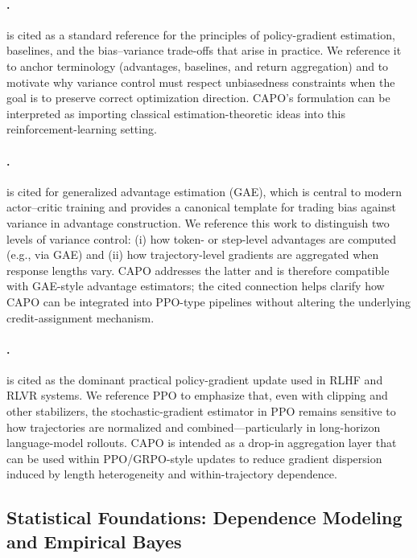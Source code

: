 \paragraph{\citet{sutton2018rl}.}
\citet{sutton2018rl} is cited as a standard reference for the principles of policy-gradient estimation, baselines, and the bias--variance trade-offs that arise in practice.
We reference it to anchor terminology (advantages, baselines, and return aggregation) and to motivate why variance control must respect unbiasedness constraints when the goal is to preserve correct optimization direction.
CAPO's formulation can be interpreted as importing classical estimation-theoretic ideas into this reinforcement-learning setting.

\paragraph{\citet{schulman2016gae}.}
\citet{schulman2016gae} is cited for generalized advantage estimation (GAE), which is central to modern actor--critic training and provides a canonical template for trading bias against variance in advantage construction.
We reference this work to distinguish two levels of variance control: (i) how token- or step-level advantages are computed (e.g., via GAE) and (ii) how trajectory-level gradients are aggregated when response lengths vary.
CAPO addresses the latter and is therefore compatible with GAE-style advantage estimators; the cited connection helps clarify how CAPO can be integrated into PPO-type pipelines without altering the underlying credit-assignment mechanism.

\paragraph{\citet{schulman2017ppo}.}
\citet{schulman2017ppo} is cited as the dominant practical policy-gradient update used in RLHF and RLVR systems.
We reference PPO to emphasize that, even with clipping and other stabilizers, the stochastic-gradient estimator in PPO remains sensitive to how trajectories are normalized and combined---particularly in long-horizon language-model rollouts.
CAPO is intended as a drop-in aggregation layer that can be used within PPO/GRPO-style updates to reduce gradient dispersion induced by length heterogeneity and within-trajectory dependence.

\subsection{Statistical Foundations: Dependence Modeling and Empirical Bayes}


